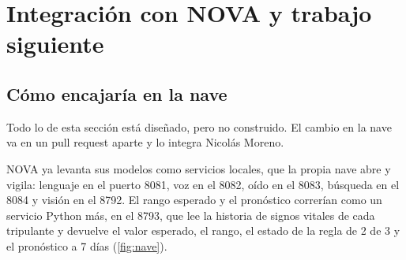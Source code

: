 \chapter{Integración con NOVA y trabajo siguiente}\label{cap:nova}

\section{Cómo encajaría en la nave}

\begin{cuidado}
Todo lo de esta sección está diseñado, pero no construido. El cambio en la nave va en un pull request aparte y lo
integra Nicolás Moreno.
\end{cuidado}

NOVA ya levanta sus modelos como servicios locales, que la propia nave abre y vigila: lenguaje en el puerto 8081, voz
en el 8082, oído en el 8083, búsqueda en el 8084 y visión en el 8792. El rango esperado y el pronóstico correrían como
un servicio Python más, en el 8793, que lee la historia de signos vitales de cada tripulante y devuelve el valor
esperado, el rango, el estado de la regla de 2 de 3 y el pronóstico a 7 días (\cref{fig:nave}).

